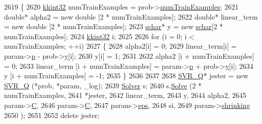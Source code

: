 \begin{DoxyCode}
2619 \{
2620   \hyperlink{namespace_k_k_b_a8fa4952cc84fda1de4bec1fbdd8d5b1b}{kkint32} numTrainExamples = prob->\hyperlink{struct_s_v_m289___m_f_s_1_1svm__problem_a16d137e053c79776e064691a20fa80ee}{numTrainExamples};
2621   \textcolor{keywordtype}{double}*  alpha2       = \textcolor{keyword}{new} \textcolor{keywordtype}{double} [2 * numTrainExamples];
2622   \textcolor{keywordtype}{double}*  linear\_term  = \textcolor{keyword}{new} \textcolor{keywordtype}{double} [2 * numTrainExamples];
2623   \hyperlink{namespace_s_v_m289___m_f_s_a27545e8471784d831870feacd3e831ff}{schar}*   y = \textcolor{keyword}{new} \hyperlink{namespace_s_v_m289___m_f_s_a27545e8471784d831870feacd3e831ff}{schar}[2 * numTrainExamples];
2624   \hyperlink{namespace_k_k_b_a8fa4952cc84fda1de4bec1fbdd8d5b1b}{kkint32} i;
2625 
2626   \textcolor{keywordflow}{for}  (i = 0;  i < numTrainExamples;  ++i)
2627   \{
2628     alpha2[i] = 0;
2629     linear\_term[i] = param->\hyperlink{struct_s_v_m289___m_f_s_1_1svm__parameter_a4b725c044491ebddf8f2c290af4fd288}{p} - prob->\hyperlink{struct_s_v_m289___m_f_s_1_1svm__problem_a56cf75f3e15322e1928a8294f9a55d2a}{y}[i];
2630     y[i] = 1;
2631 
2632     alpha2      [i + numTrainExamples] = 0;
2633     linear\_term [i + numTrainExamples] = param->\hyperlink{struct_s_v_m289___m_f_s_1_1svm__parameter_a4b725c044491ebddf8f2c290af4fd288}{p} + prob->\hyperlink{struct_s_v_m289___m_f_s_1_1svm__problem_a56cf75f3e15322e1928a8294f9a55d2a}{y}[i];
2634     y           [i + numTrainExamples] = -1;
2635   \}
2636 
2637 
2638   \hyperlink{class_s_v_m289___m_f_s_1_1_s_v_r___q}{SVR\_Q}*  jester = \textcolor{keyword}{new} \hyperlink{class_s_v_m289___m_f_s_1_1_s_v_r___q}{SVR\_Q} (*prob, *param, \_log);
2639   \hyperlink{class_s_v_m289___m_f_s_1_1_solver}{Solver} s;
2640   s.\hyperlink{class_s_v_m289___m_f_s_1_1_solver_a56d615f6e895522527fd930534956d67}{Solve} (2 * numTrainExamples, 
2641            *jester, 
2642            linear\_term, 
2643            y,
2644            alpha2, 
2645            param->\hyperlink{struct_s_v_m289___m_f_s_1_1svm__parameter_aac66b1e8a16d4076bfe8b45e82bd8e7a}{C}, 
2646            param->\hyperlink{struct_s_v_m289___m_f_s_1_1svm__parameter_aac66b1e8a16d4076bfe8b45e82bd8e7a}{C}, 
2647            param->\hyperlink{struct_s_v_m289___m_f_s_1_1svm__parameter_aa5c12a469759ffdc931e8b8ef2496cc4}{eps}, 
2648            si, 
2649            param->\hyperlink{struct_s_v_m289___m_f_s_1_1svm__parameter_aee00cd2472bcdd191d7616750078e3f8}{shrinking}
2650           );
2651 
2652   \textcolor{keyword}{delete}  jester;

\end{DoxyCode}
